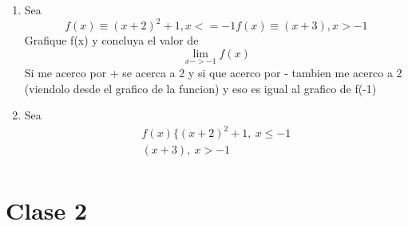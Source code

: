 \documentclass{article}
\begin{document}
\begin{enumerate}
                \item  Sea \begin{equation}
                    f(x) \equiv (x+2)^2 + 1, x<=-1   
                    f(x) \equiv (x+3), x>-1 
                    \end{equation}
                    Grafique f(x) y concluya el valor de \begin{equation}
                        \lim_{x->-1} f(x)
                    \end{equation} Si me acerco por + se acerca a 2 y si que acerco por - tambien me acerco a 2 (viendolo desde el grafico de la funcion)
                    y eso es igual al grafico de f(-1)
                \item Sea \begin{equation}
                    \begin{aligned}
                        f(x) \biggl\{    (x+2)^2+1,\ x\leq -1   
                        \\     
                        (x+3), \ x>-1 
                        \\
                    \end{aligned}
                \end{equation}
            \end{enumerate}
        \section{Clase 2}
\end{document}
